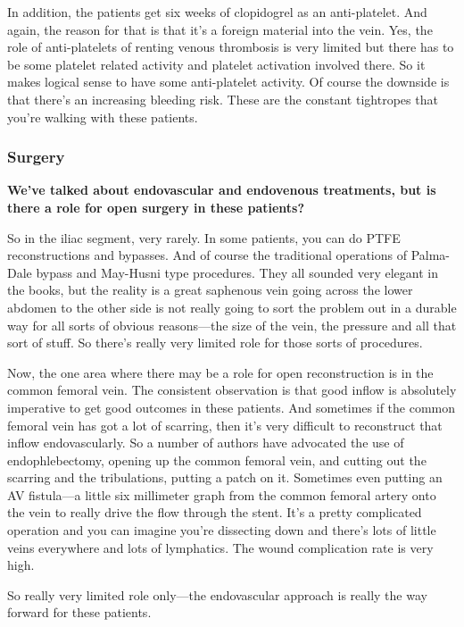 \documentclass[
]{book}
\begin{document}
In addition, the patients get six weeks of clopidogrel as an
anti-platelet. And again, the reason for that is that it's a foreign
material into the vein. Yes, the role of anti-platelets of renting
venous thrombosis is very limited but there has to be some platelet
related activity and platelet activation involved there. So it makes
logical sense to have some anti-platelet activity. Of course the
downside is that there's an increasing bleeding risk. These are the
constant tightropes that you're walking with these patients.

\hypertarget{surgery-2}{%
\subsubsection{Surgery}\label{surgery-2}}

\textbf{We've talked about endovascular and endovenous treatments, but is
there a role for open surgery in these patients?}

So in the iliac segment, very rarely. In some patients, you can do PTFE
reconstructions and bypasses. And of course the traditional operations
of Palma-Dale\citep{palma1960} bypass and May-Husni\citep{shaydakov2015} type
procedures. They all sounded very elegant in the books, but the reality
is a great saphenous vein going across the lower abdomen to the other
side is not really going to sort the problem out in a durable way for
all sorts of obvious reasons---the size of the vein, the pressure and
all that sort of stuff. So there's really very limited role for those
sorts of procedures.

Now, the one area where there may be a role for open reconstruction is
in the common femoral vein. The consistent observation is that good
inflow is absolutely imperative to get good outcomes in these patients.
And sometimes if the common femoral vein has got a lot of scarring, then
it's very difficult to reconstruct that inflow endovascularly. So a
number of authors have advocated the use of endophlebectomy, opening up
the common femoral vein, and cutting out the scarring and the
tribulations, putting a patch on it. Sometimes even putting an AV
fistula---a little six millimeter graph from the common femoral artery
onto the vein to really drive the flow through the stent. It's a pretty
complicated operation and you can imagine you're dissecting down and
there's lots of little veins everywhere and lots of lymphatics. The
wound complication rate is very high.

So really very limited role only---the endovascular approach is really
the way forward for these patients.
\end{document}
